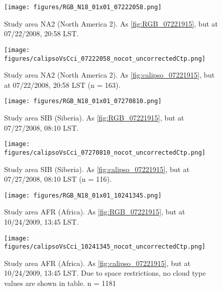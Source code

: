 \clearpage

\begin{figure*}[h]
  \texttt{[image: figures/RGB\_N18\_01x01\_07222058.png]}
  \caption{Study area NA2 (North America 2). As \autoref{fig:RGB_07221915}, but at 07/22/2008, 20:58 LST.}
  \label{fig:RGB_07222058}
  \texttt{[image: figures/calipsoVsCci\_07222058\_nocot\_uncorrectedCtp.png]}
  \caption{Study area NA2 (North America 2). As \autoref{fig:calipso_07221915}, but at 07/22/2008, 20:58 LST (n = 163).}
  \label{fig:calipso_07222058}
\end{figure*}

\clearpage

\begin{figure*}[h]
  \texttt{[image: figures/RGB\_N18\_01x01\_07270810.png]} %
  \caption{Study area SIB (Siberia). As \autoref{fig:RGB_07221915}, but at 07/27/2008, 08:10 LST.}
  \label{fig:RGB_07270810}
  \texttt{[image: figures/calipsoVsCci\_07270810\_nocot\_uncorrectedCtp.png]}
  \caption{Study area SIB (Siberia). As \autoref{fig:calipso_07221915}, but at 07/27/2008, 08:10 LST (n = 116).}
  \label{fig:calipso_07271915}
\end{figure*}

\clearpage

\begin{figure*}[h]
  \texttt{[image: figures/RGB\_N18\_01x01\_10241345.png]} %
  \caption{Study area AFR (Africa). As \autoref{fig:RGB_07221915}, but at 10/24/2009, 13:45 LST.}
  \label{fig:RGB_10241345}
  \texttt{[image: figures/calipsoVsCci\_10241345\_nocot\_uncorrectedCtp.png]}
  \caption{Study area AFR (Africa). As \autoref{fig:calipso_07221915}, but at 10/24/2009, 13:45 LST. Due to space restrictions, no cloud type values are shown in table. n = 1181} 
  \label{fig:calipso_10241345}
\end{figure*}

\clearpage

